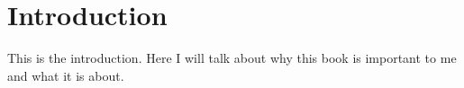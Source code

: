\chapter{Introduction}
This is the introduction. Here I will talk about why this book is important to me and what it is about.
